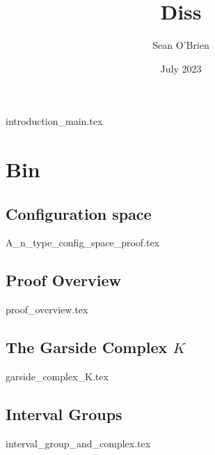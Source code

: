 \documentclass{article}
\title{Diss}
\author{Sean O'Brien}
\date{July 2023}
\begin{document}
\maketitle
{introduction_main.tex}



\section{Bin}
\subsection{Configuration space}
{A_n_type_config_space_proof.tex}
\subsection{Proof Overview}
{proof_overview.tex}
\subsection{The Garside Complex $K$}
{garside_complex_K.tex}
\subsection{Interval Groups}
{interval_group_and_complex.tex}

\printbibliography
\end{document}
